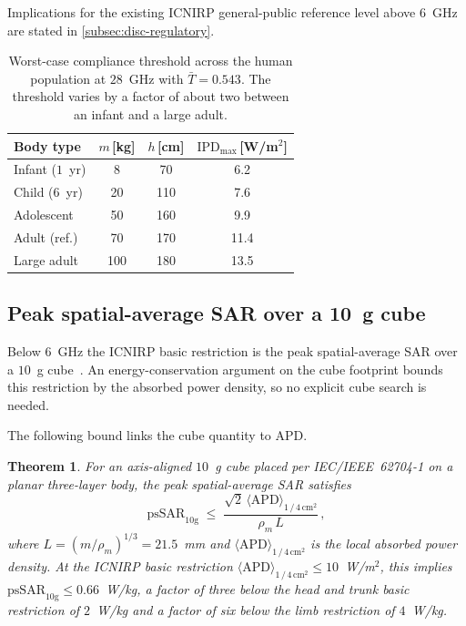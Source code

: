 \documentclass[journal,twocolumn,10pt]{IEEEtran}
\theoremstyle{plain}
\newtheorem{theorem}{Theorem}
\newcommand{\IPD}{\mathrm{IPD}}
\newcommand{\Tbar}{\bar{T}}
\newcommand{\APDAvg}{\langle\mathrm{APD}\rangle_{1\,/\,4\,\mathrm{cm}^2}}
\begin{document}
Implications for the existing ICNIRP general-public reference level
above $6$~GHz are stated in \cref{subsec:disc-regulatory}.

\begin{table}[!t]
\centering
\caption{Worst-case compliance threshold across the human
population at $28$~GHz with $\Tbar = 0.543$. The threshold
varies by a factor of about two between an infant and a large adult.}
\label{tab:anthro}
\small
\setlength{\tabcolsep}{3pt}
\begin{tabular}{lccc}
\toprule
Body type & $m$\,[kg] & $h$\,[cm] & $\IPD_{\mathrm{max}}$\,[W/m$^2$] \\
\midrule
Infant ($1$~yr) & 8   & 70  & 6.2  \\
Child ($6$~yr)  & 20  & 110 & 7.6  \\
Adolescent      & 50  & 160 & 9.9  \\
Adult (ref.)    & 70  & 170 & 11.4 \\
Large adult     & 100 & 180 & 13.5 \\
\bottomrule
\end{tabular}
\end{table}

\subsection{Peak spatial-average SAR over a 10~g cube}\label{subsec:compl-cube}

Below $6$~GHz the ICNIRP basic restriction is the peak spatial-average
SAR over a $10$~g cube~\cite{ICNIRP2020,62704-1}. An
energy-conservation argument on the cube footprint bounds this
restriction by the absorbed power density, so no explicit cube search
is needed.

The following bound links the cube quantity to APD.
\begin{theorem}\label{thm:apd-bound}
For an axis-aligned $10$~g cube placed per IEC/IEEE~62704-1 on a planar
three-layer body, the peak spatial-average SAR satisfies
\begin{equation}\label{eq:apd-bound}
  \mathrm{psSAR}_{10\mathrm{g}}
  \;\le\; \frac{\sqrt{2}\,\APDAvg}{\rho_m\,L}\, ,
\end{equation}
where $L = (m/\rho_m)^{1/3} = 21.5$~mm and $\APDAvg$ is the local
absorbed power density. At the ICNIRP basic restriction
$\APDAvg \le 10$~W/m$^2$, this implies
$\mathrm{psSAR}_{10\mathrm{g}} \le 0.66$~W/kg, a factor of three below
the head and trunk basic restriction of $2$~W/kg and a factor of six
below the limb restriction of $4$~W/kg.
\end{theorem}
\end{document}
